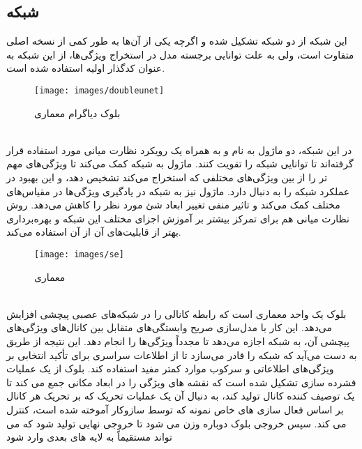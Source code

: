 \subsection{ شبکه }
این شبکه از دو شبکه  تشکیل شده و اگرچه یکی از آن‌ها به طور کمی از نسخه اصلی متفاوت است، ولی به علت توانایی برجسته مدل  در استخراج ویژگی‌ها، از این شبکه به عنوان کدگذار اولیه  استفاده شده است. 
\\
\begin{figure}[h]
\centerline{\texttt{[image: images/doubleunet]}}
\caption[بلوک دیاگرام معماری ]{بلوک دیاگرام معماری \cite{jha2020doubleu}}
\label{fig:doubleunet}
\end{figure}
\\
در این شبکه، دو ماژول به نام  و  به همراه یک رویکرد نظارت میانی مورد استفاده قرار گرفته‌اند تا توانایی شبکه را تقویت کنند. ماژول  به شبکه کمک می‌کند تا ویژگی‌های مهم تر را از بین ویژگی‌های مختلفی که استخراج می‌کند تشخیص دهد، و این بهبود در عملکرد شبکه را به دنبال دارد. ماژول  نیز به شبکه در یادگیری ویژگی‌ها در مقیاس‌های مختلف کمک می‌کند و تاثیر منفی تغییر ابعاد شئ مورد نظر را کاهش می‌دهد. روش نظارت میانی هم برای تمرکز بیشتر بر آموزش اجزای مختلف این شبکه و بهره‌برداری بهتر از قابلیت‌های آن از آن استفاده می‌کند. 
\\
\begin{figure}[h]
\centerline{\texttt{[image: images/se]}}
\caption[معماری ]{معماری  \cite{hu2018squeeze}}
\label{fig:se}
\end{figure}
\\
بلوک  یک واحد معماری است که رابطه کانالی را در شبکه‌های عصبی پیچشی افزایش می‌دهد. این کار با مدل‌سازی صریح وابستگی‌های متقابل بین کانال‌های ویژگی‌های پیچشی آن، به شبکه اجازه می‌دهد تا مجدداً  ویژگی‌ها را انجام دهد. این نتیجه از طریق  به دست می‌آید که شبکه را قادر می‌سازد تا از اطلاعات سراسری برای تأکید انتخابی بر ویژگی‌های اطلاعاتی و سرکوب موارد کمتر مفید استفاده کند. بلوک  از یک عملیات فشرده سازی تشکیل شده است که نقشه های ویژگی را در ابعاد مکانی جمع می کند تا یک توصیف کننده کانال تولید کند، به دنبال آن یک عملیات تحریک که بر تحریک هر کانال بر اساس فعال سازی های خاص نمونه که توسط سازوکار  آموخته شده است، کنترل می کند. سپس خروجی بلوک  دوباره وزن می شود تا خروجی نهایی تولید شود که می تواند مستقیماً به لایه های بعدی وارد شود\cite{hu2018squeeze}
